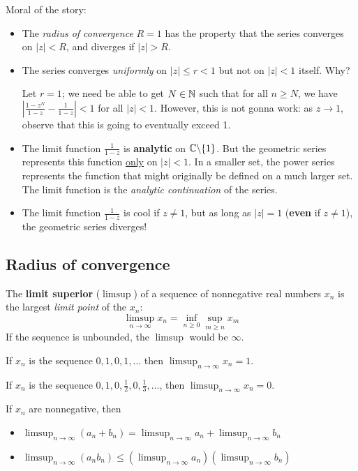 \documentclass[12pt]{article}
\begin{document}
\rmk Moral of the story: \begin{itemize}
    \item The \textit{radius of convergence} $R=1$ has the property that the series converges on $|z|<R$, and diverges if $|z|>R$.
    
    \item The series converges \textit{uniformly} on $|z|\leq r<1$ but not on $|z|<1$ itself. Why?
    
    Let $r=1$; we need be able to get $N\in \mathbb{N}$ such that for all $n\geq N$, we have $\left|\frac{1-z^N}{1-z}-\frac{1}{1-z}\right|<1$ for all $|z|<1$. However, this is not gonna work: as $z\to 1$, observe that this is going to eventually exceed 1. 

    \item The limit function $\displaystyle \frac{1}{1-z}$ is \textbf{analytic} on $\mathbb{C}\backslash\{1\}$. But the geometric series represents this function \underline{only} on $|z|<1$. In a smaller set, the power series represents the function that might originally be defined on a much larger set. The limit function is the \textit{analytic continuation} of the series.
    
    \item The limit function $\displaystyle \frac{1}{1-z}$ is cool if $z\neq 1$, but as long as $|z|=1$ (\textbf{even} if $z\neq 1$), the geometric series diverges!
\end{itemize}

\subsection{Radius of convergence}
 The \textbf{limit superior} ($\limsup$) of a sequence of nonnegative real numbers $x_n$ is the largest \textit{limit point} of the $x_n$: $$\limsup_{n\to \infty}x_n=\inf_{n\geq 0}\sup_{m\geq n}x_m$$
If the sequence is unbounded, the $\limsup$ would be $\infty$.

\eg If $x_n$ is the sequence $0,1,0,1,\dots$ then $\displaystyle\limsup_{n\to \infty}x_n=1$.

\eg If $x_n$ is the sequence $0,1,0,\frac{1}{2}, 0, \frac{1}{3},\dots$, then $\displaystyle\limsup_{n\to \infty}x_n=0$.

\rmk If $x_n$ are nonnegative, then \begin{itemize}
    \item $\displaystyle \limsup_{n\to \infty}(a_n+b_n)=\limsup_{n\to \infty}a_n+\limsup_{n\to \infty}b_n$
    \item $\displaystyle \limsup_{n\to \infty}(a_nb_n)\leq (\limsup_{n\to \infty}a_n)(\limsup_{n\to \infty}b_n)$
\end{itemize}
\end{document}
